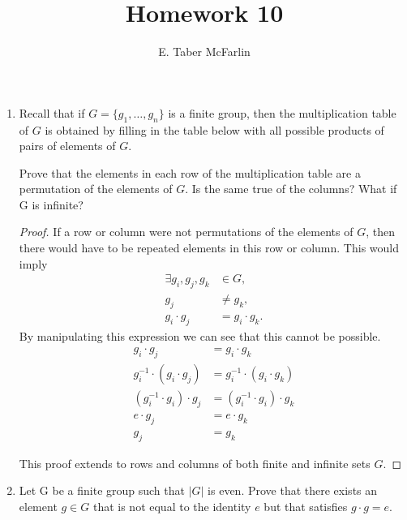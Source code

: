 \documentclass[12pt,a4paper,reqno,parskip=full]{amsart}
\numberwithin{equation}{section}
\theoremstyle{plain}
\theoremstyle{definition}
\begin{document}
\title{Homework 10}

\author{E. Taber McFarlin}

\maketitle

\begin{enumerate}
  \item Recall that if $G=\{g_1,\ldots,g_n\}$ is a finite group, then the
        multiplication table of $G$ is obtained by filling in the table below
        with all possible products of pairs of elements of $G$.

        Prove that the elements in each row of the multiplication table are a
        permutation of the elements of $G$. Is the same true of the columns?
        What if G is infinite?

        \begin{proof}
          If a row or column were not permutations of the elements of $G$,
          then there would have to be repeated elements in this row or column.
          This would imply
          \begin{align*}
            \exists g_i,g_j,g_k & \in G,          \\
            g_j                 & \neq g_k,       \\
            g_i\cdot g_j        & = g_i\cdot g_k.
          \end{align*}
          By manipulating this expression we can see that this cannot be possible.
          \begin{align*}
            g_i\cdot g_j                 & = g_i\cdot g_k                 \\
            g_i^{-1}\cdot(g_i\cdot g_j)  & = g_i^{-1}\cdot(g_i\cdot g_k)  \\
            (g_i^{-1}\cdot g_i)\cdot g_j & = (g_i^{-1}\cdot g_i)\cdot g_k \\
            e\cdot g_j                   & = e\cdot g_k                   \\
            g_j                          & = g_k
          \end{align*}

          This proof extends to rows and columns of both finite and infinite sets $G$.
        \end{proof}
  \item Let G be a finite group such that $|G|$ is even. Prove that there
        exists an element $g\in G$ that is not equal to the identity $e$
        but that satisfies $g\cdot g=e$.


\end{enumerate}
\end{document}
